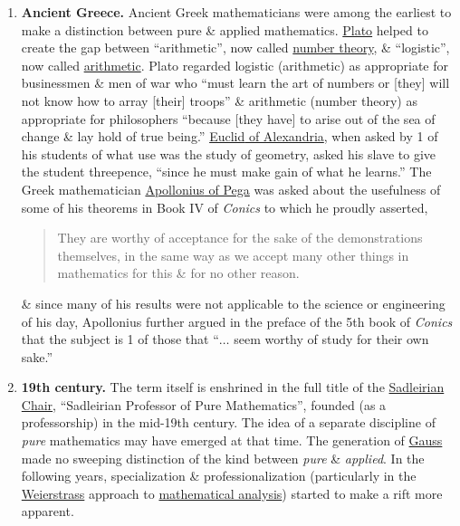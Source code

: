 \documentclass{article}
\begin{document}
\begin{enumerate}
	\item {\bf Ancient Greece.} Ancient Greek mathematicians were among the earliest to make a distinction between pure \& applied mathematics. \href{https://en.wikipedia.org/wiki/Plato}{\sc Plato} helped to create the gap between ``arithmetic'', now called \href{https://en.wikipedia.org/wiki/Number_theory}{number theory}, \& ``logistic'', now called \href{https://en.wikipedia.org/wiki/Arithmetic}{arithmetic}. {\sc Plato} regarded logistic (arithmetic) as appropriate for businessmen \& men of war who ``must learn the art of numbers or [they] will not know how to array [their] troops'' \& arithmetic (number theory) as appropriate for philosophers ``because [they have] to arise out of the sea of change \& lay hold of true being.'' \href{https://en.wikipedia.org/wiki/Euclid_of_Alexandria}{{\sc Euclid} of Alexandria}, when asked by 1 of his students of what use was the study of geometry, asked his slave to give the student threepence, ``since he must make gain of what he learns.'' The Greek mathematician \href{https://en.wikipedia.org/wiki/Apollonius_of_Perga}{{\sc Apollonius} of Pega} was asked about the usefulness of some of his theorems in Book IV of {\it Conics} to which he proudly asserted,
	\begin{quote}
		They are worthy of acceptance for the sake of the demonstrations themselves, in the same way as we accept many other things in mathematics for this \& for no other reason.
	\end{quote}
	\& since many of his results were not applicable to the science or engineering of his day, {\sc Apollonius} further argued in the preface of the 5th book of {\it Conics} that the subject is 1 of those that ``$\ldots$ seem worthy of study for their own sake.''
	\item {\bf19th century.} The term itself is enshrined in the full title of the \href{https://en.wikipedia.org/wiki/Sadleirian_Professor_of_Pure_Mathematics}{Sadleirian Chair}, ``Sadleirian Professor of Pure Mathematics'', founded (as a professorship) in the mid-19th century. The idea of a separate discipline of {\it pure} mathematics may have emerged at that time. The generation of \href{https://en.wikipedia.org/wiki/Carl_Friedrich_Gauss}{\sc Gauss} made no sweeping distinction of the kind between {\it pure} \& {\it applied}. In the following years, specialization \& professionalization (particularly in the \href{https://en.wikipedia.org/wiki/Weierstrass}{\sc Weierstrass} approach to \href{https://en.wikipedia.org/wiki/Mathematical_analysis}{mathematical analysis}) started to make a rift more apparent.

\end{enumerate}
\end{document}
